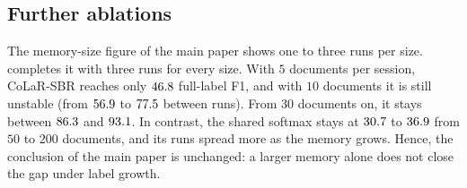 \begin{table}[t]
\centering\small
\setlength{\tabcolsep}{5pt}
\caption{\textbf{Patience of the baselines} on CIL-FUNSD (AA; mean $\pm$ s.d.\ of three runs; ``--'': not run).}
\label{tab:patience}

\end{table}

\subsection{Further ablations}
\label{app:moreabl}

\begin{table}[t]
\centering\small
\setlength{\tabcolsep}{5pt}
\caption{\textbf{Memory size} on CIL-CORD (mean $\pm$ s.d.\ of three runs; bold: the default size).}
\label{tab:budget}
\resizebox{\linewidth}{!}{}
\end{table}

 The memory-size figure of the main paper shows one to three runs per size.  completes it with three runs for every size. With $5$ documents per session, CoLaR-SBR reaches only $46.8$ full-label F1, and with $10$ documents it is still unstable (from $56.9$ to $77.5$ between runs). From $30$ documents on, it stays between $86.3$ and $93.1$. In contrast, the shared softmax stays at $30.7$ to $36.9$ from $50$ to $200$ documents, and its runs spread more as the memory grows. Hence, the conclusion of the main paper is unchanged: a larger memory alone does not close the gap under label growth.

\begin{table}[t]
\centering\small
\setlength{\tabcolsep}{3pt}
\caption{\textbf{Design choices of SBR-Recall} (AA, mean $\pm$ s.d.\ of three runs): the capacity of the deltas on CIL-CORD and the memory across schemas on Mixed. Min $R[j,j]$: the lowest F1 of a session right after it is learned; min $R[T,j]$: the lowest final F1 of a session, both over all runs.}
\label{tab:ablext}
\resizebox{\linewidth}{!}{}
\end{table}

